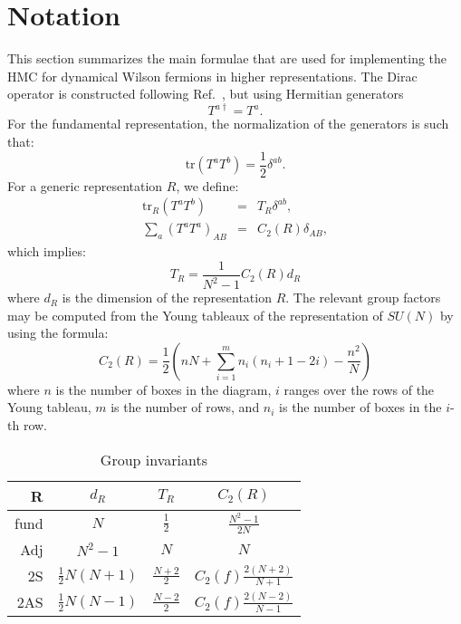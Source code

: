 \documentclass{article}[12pt]
\begin{document}
\section{Notation}
This section summarizes the main formulae that are used for
implementing the HMC for dynamical Wilson fermions in higher
representations. The Dirac operator is constructed following 
Ref.~\cite{Luscher:1996sc}, but using Hermitian generators 
%
\begin{equation}
T^{a\dagger}=T^a.
\end{equation}
%
For the fundamental representation, the normalization of the
generators is such that:
%
\begin{equation}
\mathrm{tr } \left(T^a T^b \right) = \frac12 \delta^{ab}.
\end{equation}
%
For a generic representation $R$, we define:
%
\begin{eqnarray}
\mathrm{tr }_R \left(T^a T^b \right) &=& T_R \delta^{ab}, \\
\sum_a \left(T^a T^a \right)_{AB} &=& C_2(R) \delta_{AB},
\end{eqnarray}
%
which implies: 
%
\begin{equation}
T_R = \frac{1}{N^2-1} C_2(R) d_R
\end{equation}
%
where $d_R$ is the dimension of the representation $R$.
The relevant group factors may be computed from the Young tableaux of the
representation of $SU(N)$ by using the formula:
%
\begin{equation}
C_2(R) =\frac{1}{2}\left(nN+ \sum_{i=1}^{m} n_i \left( n_i+1-2i
\right) - \frac{n^2}{N}\right)
\end{equation}
%
where $n$ is the number of boxes in the diagram, $i$ ranges over the
rows of the Young tableau, $m$ is the number of rows, and $n_i$ is the
number of boxes in the $i$-th row. 

\begin{table}[htp]
\begin{center}
\caption{Group invariants}
\label{table1}
\begin{tabular}{r|c|c|c}
R    & $d_R$               & $T_R$           & $C_2(R)$            \\
\hline
fund & $N$                 & $\frac12$       & $\frac{N^2-1}{2 N}$ \\        
Adj  & $N^2-1$             & $N$             & $N$ \\
2S   & $\frac{1}{2}N(N+1)$ & $\frac{N+2}{2}$ & $C_2(f) \frac{2(N+2)}{N+1}$ \\
2AS  & $\frac{1}{2}N(N-1)$ & $\frac{N-2}{2}$ & $C_2(f)
\frac{2(N-2)}{N-1}$ \\
\hline
\end{tabular}
\end{center}
\end{table}
\end{document}
